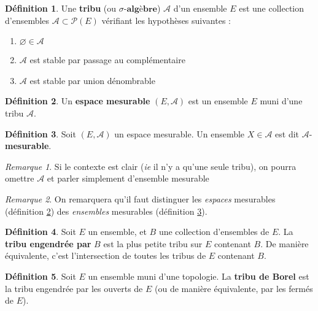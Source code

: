 \documentclass[french]{report}
\theoremstyle{plain}
\theoremstyle{definition}
\newtheorem{defi}{Définition}[section]
\theoremstyle{remark}
\newtheorem{rem}{Remarque}[section]
\begin{document}
\begin{defi}
  Une \textbf{tribu} (ou $\sigma\textbf{-algèbre}$) $\mathcal{A}$ d'un ensemble $E$ est une collection d'ensembles $\mathcal{A} \subset \mathcal{P}(E)$ vérifiant les hypothèses suivantes :
  \begin{enumerate}
    \item $\varnothing \in \mathcal{A}$
    \item $\mathcal{A}$ est stable par passage au complémentaire
    \item $\mathcal{A}$ est stable par union dénombrable
  \end{enumerate}
\end{defi}

\begin{defi}
  \label{defi:espmes}
  Un \textbf{espace mesurable} $\left(E, \mathcal{A}\right)$ est un ensemble $E$ muni d'une tribu $\mathcal{A}$.
\end{defi}

\begin{defi}
  \label{defi:ensmes}
  Soit $\left(E, \mathcal{A}\right)$ un espace mesurable. Un ensemble $X\in \mathcal{A}$ est dit $\mathcal{A}$-\textbf{mesurable}.
\end{defi}

\begin{rem}
  Si le contexte est clair (\textit{ie} il n'y a qu'une seule tribu), on pourra omettre $\mathcal{A}$ et parler simplement d'ensemble mesurable
\end{rem}

\begin{rem}
  On remarquera qu'il faut distinguer les \textit{espaces} mesurables (définition \ref{defi:espmes}) des \textit{ensembles} mesurables (définition \ref{defi:ensmes}).
\end{rem}

\begin{defi}
  Soit $E$ un ensemble, et $B$ une collection d'ensembles de $E$.
  La \textbf{tribu engendrée par} $B$ est la plus petite tribu sur $E$ contenant $B$.
  De manière équivalente, c'est l'intersection de toutes les tribus de $E$ contenant $B$.
\end{defi}

\begin{defi}
  \label{defi:Borel}
  Soit $E$ un ensemble muni d'une topologie.
  La \textbf{tribu de Borel} est la tribu engendrée par les ouverts de $E$ (ou de manière équivalente, par les fermés de $E$).
\end{defi}
\end{document}
